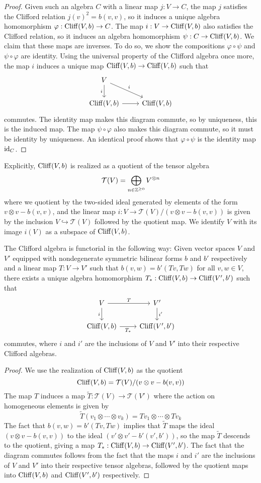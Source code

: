 \begin{proof}
Given such an algebra $C$ with a linear map $j: V \to C$, the map $j$
satisfies the Clifford relation $j(v)^2 = b(v,v)$, so it induces a unique algebra
homomorphism $\varphi : \operatorname{Cliff}(V,b) \to C$. The map $i : V \to \operatorname{Cliff}(V,b)$ also
satisfies the Clifford relation, so it induces an algebra homomorphism
$\psi : C \to \operatorname{Cliff}(V,b)$.
We claim that these maps are inverses. To do so, we show the compositions
$\varphi \circ \psi$ and $\psi \circ \varphi$ are identity. Using the
universal property of the Clifford algebra once more, the map $i$ induces
a unique map $\operatorname{Cliff}(V,b) \to \operatorname{Cliff}(V,b)$ such that
\[\begin{tikzcd}
V \ar[dr, "i"] \ar[d, "i"'] \\
\Cliff(V,b) \ar[r] & \Cliff(V,b)
\end{tikzcd}\]
commutes. The identity map makes this diagram commute, so by uniqueness, this is
the induced map. The map $\psi \circ \varphi$ also makes this diagram commute,
so it must be identity by uniqueness. An identical proof shows that
$\varphi \circ \psi$ is the identity map $\operatorname{id}_C$.
\end{proof}
%
Explicitly, $\operatorname{Cliff}(V,b)$ is realized as a quotient of the tensor algebra
\[
\mathcal{T}(V) = \bigoplus_{n \in \mathbb{Z}^{\geq 0}} V^{\otimes n}
\]
where we quotient by the two-sided ideal generated by elements of the form
$v \otimes v - b(v,v)$, and the linear map
$i: V \to \mathcal{T}(V) / (v \otimes v - b(v,v))$
is given by the inclusion $V \hookrightarrow \mathcal{T}(V)$ followed by the
quotient map. We identify $V$ with its image $i(V)$ as a subspace of $\operatorname{Cliff}(V,b)$.
%
\begin{thm}
The Clifford algebra is functorial in the following way: Given vector spaces
$V$ and $V'$ equipped with nondegenerate symmetric bilinear forms $b$ and $b'$
respectively and a linear map $T: V \to V'$ such that $b(v,w) = b'(Tv,Tw)$
for all $v,w \in V$, there exists a unique algebra homomorphism
$T_* : \operatorname{Cliff}(V,b) \to \operatorname{Cliff}(V',b')$
such that
\[\begin{tikzcd}
V \ar[r, "T"] \ar[d, "i"']& V' \ar[d, "i'"]\\
\Cliff(V,b) \ar[r, "T_*"'] & \Cliff(V',b')
\end{tikzcd}\]
commutes, where $i$ and $i'$ are the inclusions of $V$ and $V'$ into their
respective Clifford algebras.
\end{thm}
%
\begin{proof}
We use the realization of $\operatorname{Cliff}(V,b)$ as the quotient
\[
\operatorname{Cliff}(V,b) = \mathcal{T}(V) / (v \otimes v - b(v,v))
\]
The map $T$ induces a map $\tilde{T} : \mathcal{T}(V) \to \mathcal{T}(V')$
where the action on homogeneous elements is given by
\[
\tilde{T}(v_1 \otimes \cdots \otimes v_k) = Tv_1 \otimes \cdots \otimes Tv_k
\]
The fact that $b(v,w) = b'(Tv, Tw)$ implies that $\tilde{T}$ maps the
ideal $(v \otimes v - b(v,v))$ to the ideal $(v' \otimes v' - b'(v',b'))$, so
the map $\tilde{T}$ descends to the quotient, giving a map
$T_* : \operatorname{Cliff}(V,b) \to \operatorname{Cliff}(V',b')$. The fact that the diagram commutes
follows from the fact that the maps $i$ and $i'$ are the inclusions of
$V$ and $V'$ into their respective tensor algebras, followed by the quotient
maps into $\operatorname{Cliff}(V,b)$ and $\operatorname{Cliff}(V', b')$ respectively.
\end{proof}
